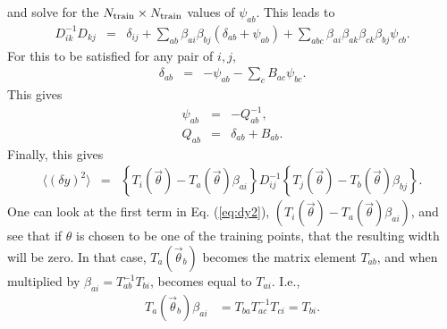 \documentclass[UserManual.tex]{subfiles}
\begin{document}
and solve for the $N_{\rm train}\times N_{\rm train}$ values of $\psi_{ab}$. This leads to
\begin{eqnarray}
D^{-1}_{ik}D_{kj}&=&
\delta_{ij}+\sum_{ab}\beta_{ai}\beta_{bj}(\delta_{ab}+\psi_{ab})+\sum_{abc}\beta_{ai}\beta_{ak}\beta_{ck}\beta_{bj}\psi_{cb}.
\end{eqnarray}
For this to be satisfied for any pair of $i,j$,
\begin{eqnarray}
\delta_{ab}&=&-\psi_{ab}-\sum_cB_{ac}\psi_{bc}.
\end{eqnarray}
This gives
\begin{eqnarray}
\psi_{ab}&=&-Q^{-1}_{ab},\\
\nonumber
Q_{ab}&=&\delta_{ab}+B_{ab}.
\end{eqnarray}
Finally, this gives
\begin{eqnarray}\label{eq:dy2}
\langle(\delta y)^2\rangle&=&
\left\{T_i(\vec{\theta})-T_{a}(\vec{\theta})\beta_{ai}\right\}D^{-1}_{ij}
\left\{T_j(\vec{\theta})-T_b(\vec{\theta})\beta_{bj}\right\}.
\end{eqnarray}
One can look at the first term in Eq. (\ref{eq:dy2}), $(T_i(\vec{\theta})-T_{a}(\vec{\theta})\beta_{ai})$, and see that if $\theta$ is chosen to be one of the training points, that the resulting width will be zero. In that case, $T_{a}(\vec{\theta}_b)$ becomes the matrix element $T_{ab}$, and when multiplied by $\beta_{ai}=T^{-1}_{ab}T_{bi}$, becomes equal to $T_{ai}$. I.e.,
\begin{eqnarray}
T_a(\vec{\theta}_b)\beta_{ai}&=T_{ba}T^{-1}_{ac}T_{ci}=T_{bi}.
\end{eqnarray}
\end{document}
